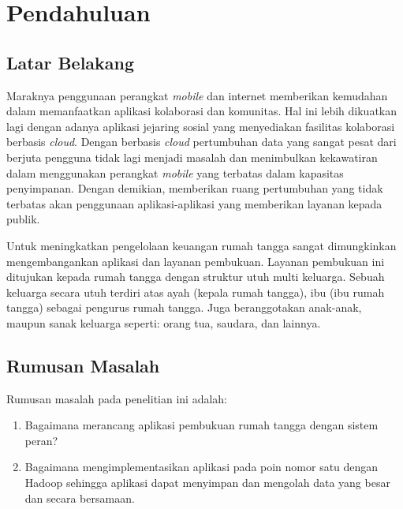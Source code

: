 \chapter{Pendahuluan}
\label{chap:pendahuluan}

\section{Latar Belakang}
\label{sec:latarbelakang}
Maraknya penggunaan perangkat \textit{mobile} dan internet memberikan kemudahan dalam memanfaatkan aplikasi kolaborasi dan komunitas. Hal ini lebih dikuatkan lagi dengan adanya aplikasi jejaring sosial yang menyediakan fasilitas kolaborasi berbasis \textit{cloud}. Dengan berbasis \textit{cloud} pertumbuhan data yang sangat pesat dari berjuta pengguna tidak lagi menjadi masalah dan menimbulkan kekawatiran dalam menggunakan perangkat \textit{mobile} yang terbatas dalam kapasitas penyimpanan. Dengan demikian, memberikan ruang pertumbuhan yang tidak terbatas akan penggunaan aplikasi-aplikasi yang memberikan layanan kepada publik. %


Untuk meningkatkan pengelolaan keuangan rumah tangga sangat dimungkinkan mengembangankan aplikasi dan layanan pembukuan. Layanan pembukuan ini ditujukan kepada rumah tangga dengan struktur utuh multi keluarga. Sebuah keluarga secara utuh terdiri atas ayah (kepala rumah tangga), ibu (ibu rumah tangga) sebagai pengurus rumah tangga. Juga beranggotakan anak-anak, maupun sanak keluarga seperti: orang tua, saudara, dan lainnya.

\section{Rumusan Masalah}
\label{sec:rumusanmalasah}

Rumusan masalah pada penelitian ini adalah:
\begin{enumerate}
\item Bagaimana merancang aplikasi pembukuan rumah tangga dengan sistem peran?
\item Bagaimana mengimplementasikan aplikasi pada poin nomor satu dengan  Hadoop sehingga aplikasi dapat menyimpan dan mengolah data yang besar dan secara bersamaan.
\end{enumerate}

